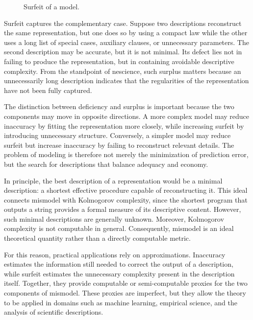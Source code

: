 \begin{figure}[t]
\centering
{}
\caption{\label{fig:intro-surfeit}Surfeit of a model.}
\end{figure}

Surfeit captures the complementary case. Suppose two descriptions reconstruct the same representation, but one does so by using a compact law while the other uses a long list of special cases, auxiliary clauses, or unnecessary parameters. The second description may be accurate, but it is not minimal. Its defect lies not in failing to produce the representation, but in containing avoidable descriptive complexity. From the standpoint of nescience, such surplus matters because an unnecessarily long description indicates that the regularities of the representation have not been fully captured.

The distinction between deficiency and surplus is important because the two components may move in opposite directions. A more complex model may reduce inaccuracy by fitting the representation more closely, while increasing surfeit by introducing unnecessary structure. Conversely, a simpler model may reduce surfeit but increase inaccuracy by failing to reconstruct relevant details. The problem of modeling is therefore not merely the minimization of prediction error, but the search for descriptions that balance adequacy and economy.

In principle, the best description of a representation would be a minimal description: a shortest effective procedure capable of reconstructing it. This ideal connects mismodel with Kolmogorov complexity, since the shortest program that outputs a string provides a formal measure of its descriptive content. However, such minimal descriptions are generally unknown. Moreover, Kolmogorov complexity is not computable in general. Consequently, mismodel is an ideal theoretical quantity rather than a directly computable metric.

For this reason, practical applications rely on approximations. Inaccuracy estimates the information still needed to correct the output of a description, while surfeit estimates the unnecessary complexity present in the description itself. Together, they provide computable or semi-computable proxies for the two components of mismodel. These proxies are imperfect, but they allow the theory to be applied in domains such as machine learning, empirical science, and the analysis of scientific descriptions.

